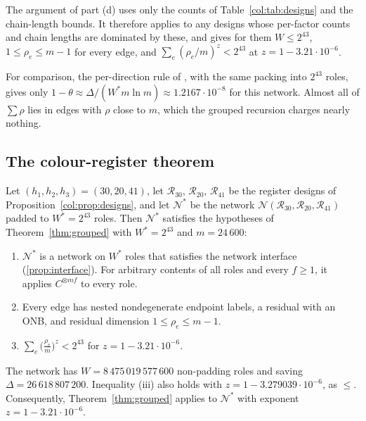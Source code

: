 \begin{remark}\label{col:rem:exponent}
The argument of part (d) uses only the counts of Table~\ref{col:tab:designs} and the chain-length
bounds. It therefore applies to any designs whose per-factor counts and chain lengths are dominated by
these, and gives for them $W\le2^{43}$, $1\le\rho_e\le m-1$ for every edge, and
$\sum_e(\rho_e/m)^z<2^{43}$ at $z=1-3.21\cdot10^{-6}$.

For comparison, the per-direction rule of \cite[Theorem~2.6]{oai}, with the same packing into $2^{43}$
roles, gives only $1-\theta\approx\Delta/(W^*m\ln m)\approx1.2167\cdot10^{-8}$ for this network. Almost
all of $\sum\rho$ lies in edges with $\rho$ close to $m$, which the grouped recursion charges nearly
nothing.
\end{remark}

\subsection{The colour-register theorem}\label{col:sec:main}

\begin{theorem}\label{col:thm:main}
Let $(h_1,h_2,h_3)=(30,20,41)$, let $\mathcal R_{30}$, $\mathcal R_{20}$, $\mathcal R_{41}$ be the register designs
of Proposition~\ref{col:prop:designs}, and let $\mathcal N^*$ be the network
$\mathcal N(\mathcal R_{30},\mathcal R_{20},\mathcal R_{41})$ padded to $W^*=2^{43}$ roles. Then $\mathcal N^*$ satisfies the
hypotheses of Theorem~\ref{thm:grouped} with $W^*=2^{43}$ and $m=24\,600$:
\begin{enumerate}
\item[(i)] $\mathcal N^*$ is a network on $W^*$ roles that satisfies the network interface
  (\ref{prop:interface}). For arbitrary contents of all roles and every $f\ge1$, it applies
  $C^{\otimes mf}$ to every role.
\item[(ii)] Every edge has nested nondegenerate endpoint labels, a residual with an ONB, and residual
  dimension $1\le\rho_e\le m-1$.
\item[(iii)] $\displaystyle\sum_e\Big(\frac{\rho_e}{m}\Big)^{z}<2^{43}$ for $z=1-3.21\cdot10^{-6}$.
\end{enumerate}
The network has $W=8\,475\,019\,577\,600$ non-padding roles and saving $\Delta=26\,618\,807\,200$.
Inequality (iii) also holds with $z=1-3.279039\cdot10^{-6}$, as $\le$. Consequently,
Theorem~\ref{thm:grouped} applies to $\mathcal N^*$ with exponent $z=1-3.21\cdot10^{-6}$.
\end{theorem}

